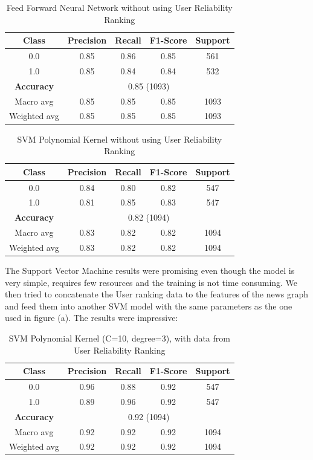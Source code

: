 \documentclass[11pt,a4paper]{article}
\begin{document}
\begin{table}[ht]
\centering
\begin{tabular}{|c|c|c|c|c|}
\hline
Class & Precision & Recall & F1-Score & Support \\
\hline
0.0    & 0.85      & 0.86   & 0.85     & 561     \\
1.0    & 0.85      & 0.84   & 0.84     & 532     \\
\hline
\textbf{Accuracy}   & \multicolumn{4}{c|}{0.85 (1093)} \\
\hline
Macro avg           & 0.85      & 0.85   & 0.85     & 1093    \\
Weighted avg        & 0.85      & 0.85   & 0.85     & 1093    \\
\hline
\end{tabular}
\caption{Feed Forward Neural Network without using User Reliability Ranking}
\end{table}


\begin{table}[ht]
\centering
\begin{tabular}{|c|c|c|c|c|}
\hline
Class & Precision & Recall & F1-Score & Support \\
\hline
0.0    & 0.84      & 0.80   & 0.82     & 547     \\
1.0    & 0.81      & 0.85   & 0.83     & 547     \\
\hline
\textbf{Accuracy}   & \multicolumn{4}{c|}{0.82 (1094)} \\
\hline
Macro avg           & 0.83      & 0.82   & 0.82     & 1094    \\
Weighted avg        & 0.83      & 0.82   & 0.82     & 1094    \\
\hline
\end{tabular}
\caption{SVM Polynomial Kernel without using User Reliability Ranking}
\end{table}

\newpage

The Support Vector Machine results were promising even though the model is very simple, requires few resources and the training is not time consuming. We then tried to concatenate the User ranking data to the features of the news graph and feed them into another SVM model with the same parameters as the one used in figure (a). The results were impressive:

\begin{table}[ht]
\centering
\begin{tabular}{|c|c|c|c|c|}
\hline
Class & Precision & Recall & F1-Score & Support \\
\hline
0.0    & 0.96      & 0.88   & 0.92     & 547     \\
1.0    & 0.89      & 0.96   & 0.92     & 547     \\
\hline
\textbf{Accuracy}   & \multicolumn{4}{c|}{0.92 (1094)} \\
\hline
Macro avg           & 0.92      & 0.92   & 0.92     & 1094    \\
Weighted avg        & 0.92      & 0.92   & 0.92     & 1094    \\
\hline
\end{tabular}
\caption{SVM Polynomial Kernel (C=10, degree=3), with data from User Reliability Ranking}
\end{table}
\end{document}
